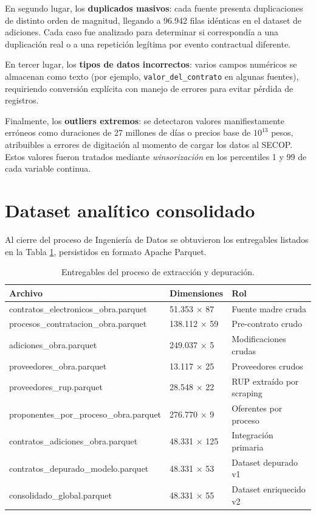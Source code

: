 \documentclass[12pt,letterpaper,oneside]{report}
\begin{document}
En segundo lugar, los \textbf{duplicados masivos}: cada fuente presenta
duplicaciones de distinto orden de magnitud, llegando a 96.942 filas idénticas
en el dataset de adiciones. Cada caso fue analizado para determinar si
correspondía a una duplicación real o a una repetición legítima por evento
contractual diferente.

En tercer lugar, los \textbf{tipos de datos incorrectos}: varios campos
numéricos se almacenan como texto (por ejemplo, \texttt{valor\_del\_contrato} en
algunas fuentes), requiriendo conversión explícita con manejo de errores para
evitar pérdida de registros.

Finalmente, los \textbf{outliers extremos}: se detectaron valores
manifiestamente erróneos como duraciones de 27 millones de días o precios base
de $10^{13}$ pesos, atribuibles a errores de digitación al momento de cargar
los datos al SECOP. Estos valores fueron tratados mediante \emph{winsorización}
en los percentiles 1 y 99 de cada variable continua.

\section{Dataset analítico consolidado}

Al cierre del proceso de Ingeniería de Datos se obtuvieron los entregables
listados en la Tabla \ref{tab:entregables}, persistidos en formato Apache
Parquet.

\begin{table}[h!]
\centering
\caption{Entregables del proceso de extracción y depuración.}
\label{tab:entregables}
\small
\begin{tabular}{p{6cm}p{2cm}p{6cm}}
\toprule
\textbf{Archivo} & \textbf{Dimensiones} & \textbf{Rol} \\
\midrule
contratos\_electronicos\_obra.parquet & 51.353 $\times$ 87 & Fuente madre cruda \\
procesos\_contratacion\_obra.parquet & 138.112 $\times$ 59 & Pre-contrato crudo \\
adiciones\_obra.parquet & 249.037 $\times$ 5 & Modificaciones crudas \\
proveedores\_obra.parquet & 13.117 $\times$ 25 & Proveedores crudos \\
proveedores\_rup.parquet & 28.548 $\times$ 22 & RUP extraído por scraping \\
proponentes\_por\_proceso\_obra.parquet & 276.770 $\times$ 9 & Oferentes por proceso \\
contratos\_adiciones\_obra.parquet & 48.331 $\times$ 125 & Integración primaria \\
contratos\_depurado\_modelo.parquet & 48.331 $\times$ 53 & Dataset depurado v1 \\
consolidado\_global.parquet & 48.331 $\times$ 55 & Dataset enriquecido v2 \\
\bottomrule
\end{tabular}
\end{table}
\end{document}
